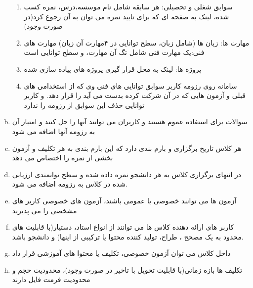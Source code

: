 \documentclass{article}
\begin{document}
\begin{enumerate}[a.]
\begin{enumerate}[1.]
                \item سوابق شغلی و تحصیلی: هر سابقه شامل نام موسسه،درس، نمره کسب شده، لینک به صفحه ای که برای تایید نمره می توان به آن رجوع کرد(در صورت وجود)
                \item مهارت ها: زبان ها (شامل زبان، سطح توانایی در ۴مهارت آن زبان) مهارت های فنی:یک مهارت فنی شامل تگ آن مهارت، و سطح توانایی است
                \item پروژه ها: لینک به محل قرار گیری پروژه های پیاده سازی شده
                \item سامانه روی رزومه کاربر سوابق توانایی های فنی وی که از استخدامی های قبلی و آزمون هایی که در آن شرکت کرده بدست می آید را قرار دهد. و کاربر توانایی حذف این سوابق از رزومه را ندارد
            \end{enumerate}
        \item سوالات برای استفاده عموم هستند و کاربران می توانند آنها را حل کنند و امتیاز آن به رزومه آنها اضافه می شود
        \item هر کلاس تاریخ برگزاری و بارم بندی دارد که این بارم بندی به هر تکلیف و آزمون بخشی از نمره را اختصاص می دهد
        \item در انتهای برگزاری کلاس به هر دانشجو نمره داده شده و سطح توانمندی ارزیابی شده در کلاس به رزومه اضافه می شود.
        \item آزمون ها می توانند خصوصی یا عمومی باشند، آزمون های خصوصی کاربر های مشخصی را می پذیرند
        \item کاربر های ارائه دهنده کلاس ها می توانند از انواع استاد، دستیار(با قابلیت های محدود به یک مصحح ، طراح، تولید کننده محتوا یا ترکیبی از اینها) و دانشجو باشد.
        \item داخل کلاس می توان آزمون خصوصی، تکلیف یا محتوا های آموزشی قرار داد
        \item تکلیف ها بازه زمانی(با قابلیت تحویل با تاخیر در صورت وجود)، محدودیت حجم و محدودیت فرمت فایل دارند
        
    \end{enumerate}
\end{document}
